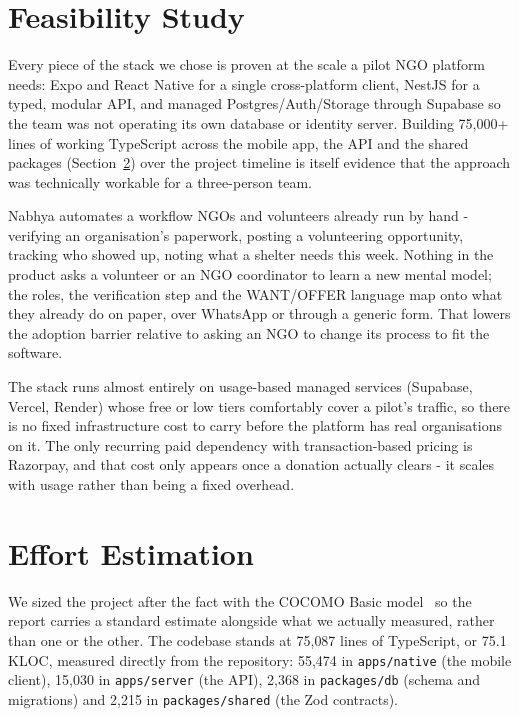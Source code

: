 \section{Feasibility Study}
\label{sec:feasibility}
\begin{description}[leftmargin=0pt, itemindent=0pt, labelsep=0.4em, font=\bfseries]
  \item[Technical feasibility:] Every piece of the stack we chose is proven at the scale a pilot NGO platform needs: Expo and React Native for a single cross-platform client, NestJS for a typed, modular API, and managed Postgres/Auth/Storage through Supabase so the team was not operating its own database or identity server. Building 75{,}000+ lines of working TypeScript across the mobile app, the API and the shared packages (Section~\ref{sec:effort-estimation}) over the project timeline is itself evidence that the approach was technically workable for a three-person team.
  \item[Operational feasibility:] Nabhya automates a workflow NGOs and volunteers already run by hand - verifying an organisation's paperwork, posting a volunteering opportunity, tracking who showed up, noting what a shelter needs this week. Nothing in the product asks a volunteer or an NGO coordinator to learn a new mental model; the roles, the verification step and the WANT/OFFER language map onto what they already do on paper, over WhatsApp or through a generic form. That lowers the adoption barrier relative to asking an NGO to change its process to fit the software.
  \item[Economic feasibility:] The stack runs almost entirely on usage-based managed services (Supabase, Vercel, Render) whose free or low tiers comfortably cover a pilot's traffic, so there is no fixed infrastructure cost to carry before the platform has real organisations on it. The only recurring paid dependency with transaction-based pricing is Razorpay, and that cost only appears once a donation actually clears - it scales with usage rather than being a fixed overhead.
\end{description}

\section{Effort Estimation}
\label{sec:effort-estimation}
We sized the project after the fact with the COCOMO Basic model~\cite{boehm1981} so the report carries a standard estimate alongside what we actually measured, rather than one or the other. The codebase stands at 75{,}087 lines of TypeScript, or 75.1 KLOC, measured directly from the repository: 55{,}474 in \texttt{apps/native} (the mobile client), 15{,}030 in \texttt{apps/server} (the API), 2{,}368 in \texttt{packages/db} (schema and migrations) and 2{,}215 in \texttt{packages/shared} (the Zod contracts).

